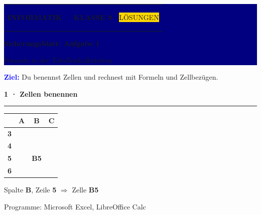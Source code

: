 \documentclass[10pt,a4paper]{article}
\newcommand{\sectiontitle}[1]{%
  \vspace{2.3mm}
  {\color{Blue}\bfseries\large #1}\par
  \vspace{0.8mm}
  {\color{Blue}\rule{\linewidth}{0.7pt}}\par
  \vspace{1.2mm}
}
\newcommand{\gridhead}[1]{\cellcolor{GridHead}\textcolor{Muted}{\bfseries\small #1}}
\newcommand{\gridrow}[1]{\cellcolor{GridHead}\textcolor{Muted}{\bfseries\small #1}}
\newcommand{\sheetsetup}{%
  \arrayrulecolor{GridLine}\setlength{\arrayrulewidth}{0.4pt}%
  \renewcommand{\arraystretch}{1.25}}
\begin{document}
\colorbox{Navy}{%
  \parbox{\dimexpr\linewidth-2\fboxsep\relax}{%
    \vspace{3mm}\color{white}
    \begin{tabularx}{\linewidth}{@{}Xr@{}}
      {\small\bfseries INFORMATIK · KLASSE 9} &
      \colorbox{Gold}{\color{Navy}\small\bfseries\strut LÖSUNGEN}
    \end{tabularx}
    \vspace{2.5mm}

    {\fontsize{22}{25}\selectfont\bfseries Sicherungsblatt: Aufgabe 1}\par
    \vspace{1mm}
    {\large Formeln in der Tabellenkalkulation}
    \vspace{3mm}
  }%
}

\vspace{3mm}
\colorbox{Sky}{%
  \parbox{\dimexpr\linewidth-2\fboxsep\relax}{%
    \vspace{1.8mm}
    \textcolor{Blue}{\bfseries Ziel:}
    Du benennst Zellen und rechnest mit Formeln und Zellbezügen.
    \vspace{1.8mm}
  }%
}

\sectiontitle{1 · Zellen benennen}

\begin{minipage}[t]{62mm}
  \vspace{0pt}
  \sheetsetup
  \begin{tabular}{|c|c|c|c|}
    \hline
    \cellcolor{GridHead} & \gridhead{A} & \gridhead{B} & \gridhead{C} \\ \hline
    \gridrow{3} & \hspace{13mm} & \hspace{13mm} & \hspace{13mm} \\ \hline
    \gridrow{4} & & & \\ \hline
    \gridrow{5} & & \cellcolor{Cell}\small\bfseries B5 & \\ \hline
    \gridrow{6} & & & \\ \hline
  \end{tabular}
\end{minipage}\hfill
\begin{minipage}[t]{\dimexpr\linewidth-68mm\relax}
  \vspace{2mm}
  Spalte \textbf{B}, Zeile \textbf{5} $\Rightarrow$ Zelle \textbf{B5}\par
  \vspace{2mm}
  Programme: Microsoft Excel, LibreOffice Calc
\end{minipage}
\end{document}
